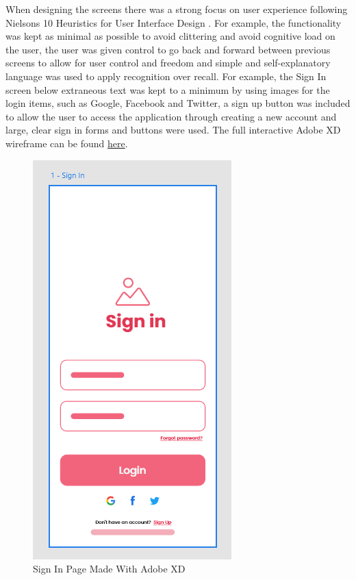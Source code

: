 \documentclass[12pt]{article}
\begin{document}
	When designing the screens there was a strong focus on user experience following Nielsons 10 Heuristics for User Interface Design \cite{experience10UsabilityHeuristics} . For example, the functionality was kept as minimal as possible to avoid clittering and avoid cognitive load on the user, the user was given control to go back and forward between previous screens to allow for user control and freedom and simple and self-explanatory language was used to apply recognition over recall. For example, the Sign In screen below extraneous text was kept to a minimum by using images for the login items, such as Google, Facebook and Twitter, a sign up button was included to allow the user to access the application through creating a new account and large, clear sign in forms and buttons were used. The full interactive Adobe XD wireframe can be found \href{https://xd.adobe.com/view/c6aeda9c-9b9a-456a-b699-cc4cd8b4cefa-93fd/}{here}. 
	
	\begin{figure}[H]
		\centering
		\includegraphics[scale=0.85]{images/sign-in.png}
		\caption{Sign In Page Made With Adobe XD}
		\label{fig:sign-in}
	\end{figure}
	
\end{document}

